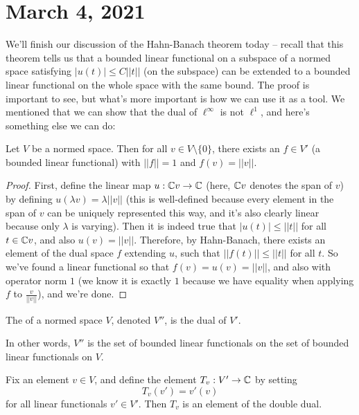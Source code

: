 \pagebreak\section{March 4, 2021}

We'll finish our discussion of the Hahn-Banach theorem today -- recall that this theorem tells us that a bounded linear functional on a subspace of a normed space satisfying $|u(t)| \le C||t||$ (on the subspace) can be extended to a bounded linear functional on the whole space with the same bound. The proof is important to see, but what's more important is how we can use it as a tool. We mentioned that we can show that the dual of $\ell^{\infty}$ is not $\ell^1$, and here's something else we can do:

\begin{theorem}\label{hahnbanachapp1}
Let $V$ be a normed space. Then for all $v \in V \setminus \{0\}$, there exists an $f \in V'$ (a bounded linear functional) with $||f|| = 1$ and $f(v) = ||v||$.
\end{theorem}
\begin{proof}
First, define the linear map $u: \mathbb C v \to \mathbb C$ (here, $\mathbb C v$ denotes the span of $v$) by defining $u(\lambda v) = \lambda ||v||$ (this is well-defined because every element in the span of $v$ can be uniquely represented this way, and it's also clearly linear because only $\lambda$ is varying). Then it is indeed true that $|u(t)| \le ||t||$ for all $t \in \mathbb C v$, and also $u(v) = ||v||$. Therefore, by Hahn-Banach, there exists an element of the dual space $f$ extending $u$, such that $||f(t)|| \le ||t||$ for all $t$. So we've found a linear functional so that $f(v) = u(v) = ||v||$, and also with operator norm $1$ (we know it is exactly $1$ because we have equality when applying $f$ to $\frac{v}{||v||}$), and we're done. 
\end{proof}

\begin{definition}
The  of a normed space $V$, denoted $V''$, is the dual of $V'$.
\end{definition}

In other words, $V''$ is the set of bounded linear functionals on the set of bounded linear functionals on $V$. 

\begin{example}
Fix an element $v \in V$, and define the element $T_v: V' \to \mathbb C$ by setting 
\[
    T_v(v') = v'(v)
\]
for all linear functionals $v' \in V'$. Then $T_v$ is an element of the double dual.
\end{example}

